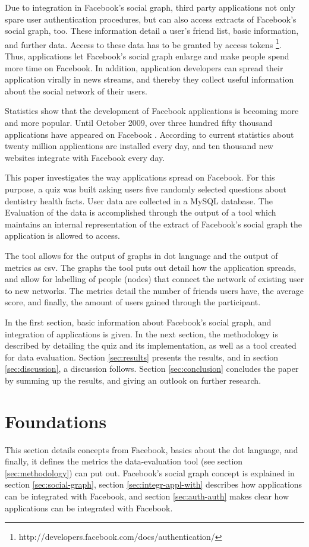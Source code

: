 \documentclass[preprint,12pt]{elsarticle}
\begin{document}
Due to integration in Facebook's social graph, third party
applications not only spare user authentication procedures, but can also access
extracts of Facebook's social graph, too. These information detail a
user's friend list, basic information, and 
further data. Access to these data has to be granted by access tokens
\footnote{http://developers.facebook.com/docs/authentication/}. Thus,
applications let Facebook's social graph enlarge and make people
spend more time on Facebook. In addition, application developers
can spread their application virally in news
streams, and thereby they collect useful information about the social network of
their users.

Statistics show that the development of Facebook applications is becoming more
and more popular. Until October 2009, 
over three hundred fifty thousand applications have appeared on Facebook \cite{facebookBlog}.
According to current statistics about twenty million applications are
installed every day, and ten thousand new websites integrate with
Facebook every day. \cite{facebookStats} 

This paper investigates the way applications spread on
Facebook. For this purpose, a quiz was built asking users five randomly
selected questions about dentistry health facts. User data are
collected in a MySQL database. The Evaluation of the data is
accomplished through the output of a tool which maintains an internal
representation of the extract of Facebook's 
social graph the application is allowed to access.

The tool allows for the output of graphs in \ac{dot} language and the output of
metrics as \ac{csv}. The graphs the tool puts out detail how the application
spreads, and allow for labelling of people (nodes) that connect the
network of existing user to new networks. The metrics detail the
number of friends users have, the average score,
and finally, the amount of users gained through the participant.

In the first section, basic information about Facebook's social graph,
and integration of applications is
given. In the next section, the methodology is described by detailing
the quiz and its implementation, as well as a tool created for data
evaluation. Section 
\ref{sec:results} presents the results, and in section
\ref{sec:discussion}, a discussion follows. Section
\ref{sec:conclusion} concludes the paper by summing up the results,
and giving an outlook on further research.


\section{Foundations}
\label{sec:background}
This section details concepts from Facebook, basics about the
\ac{dot} language, and finally, it defines the metrics the
data-evaluation tool (see section \ref{sec:methodology}) can put out. Facebook's
social graph concept is explained in 
section \ref{sec:social-graph}, section \ref{sec:integr-appl-with}
describes how applications can be integrated with Facebook, and
section \ref{sec:auth-auth} makes clear how applications can be
integrated with Facebook.
\end{document}
